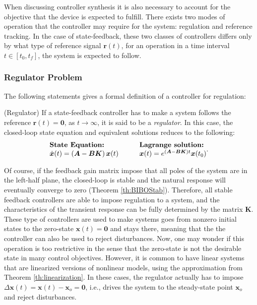 \documentclass[a4paper,11pt]{book}
\numberwithin{figure}{chapter}
\numberwithin{equation}{chapter}
\numberwithin{table}{chapter}
\theoremstyle{definition}
\newtheorem{definition}{Definition}[chapter]
\newcounter{boxed-theorem}
\newcounter{boxed-definition}
\newenvironment{boxed-definition}[1]
{\colorlet{shadecolor}{pastelYellow!15} \begin{shaded} \begin{definition}{#1}}
{\end{definition} \end{shaded}}
\newcounter{boxed-example}
\begin{document}
When discussing controller synthesis it is also necessary to account for the objective that the device is expected to fulfill. There exists two modes of operation that the controller may require for the system: regulation and reference tracking. In the case of state-feedback, these two classes of controllers differs only by what type of reference signal $\bm{r}(t)$, for an operation in a time interval $t \in [t_0, t_f]$, the system is expected to follow. 

\subsubsection{Regulator Problem}

The following statements gives a formal definition of a controller for regulation:

\begin{boxed-definition}{(Regulator)} \label{def:regulator}
    If a state-feedback controller has to make a system follows the reference $\bm{r}(t) = \bm{0}$, as $t \to \infty$, it is said to be a \textit{regulator}. In this case, the closed-loop state equation and equivalent solutions reduces to the following:
        \begin{align}
    \begin{matrix*}[l]
    \textbf{State Equation:} \hfill & & & \textbf{Lagrange solution:} \hfill \\
    \dot{\bm{x}}(t) = \left( \bm{A} - \bm{B} \bm{K} \right) \bm{x}(t)  & & &
    \bm{x}(t) = e^{(\bm{A} - \bm{B} \bm{K}) t} \bm{x}(t_0) \hfill
    \end{matrix*}
    .\end{align}
\end{boxed-definition}

Of course, if the feedback gain matrix impose that all poles of the system are in the left-half plane, the closed-loop is stable and the natural response will eventually converge to zero (Theorem \ref{th:BIBOStab}). Therefore, all stable feedback controllers are able to impose regulation to a system, and the characteristics of the transient response can be fully determined by the matrix $\bm{K}$. These type of controllers are used to make systems goes from nonzero initial states to the zero-state $\bm{x}(t) = \bm{0}$ and stays there, meaning that the the controller can also be used to reject disturbances. Now, one may wonder if this operation is too restrictive in the sense that the zero-state is not the desirable state in many control objectives. However, it is common to have linear systems that are linearized versions of nonlinear models, using the approximation from Theorem \ref{th:linearization}. In these cases, the regulator actually has to impose $\Delta \bm{x}(t) = \bm{x}(t) - \bm{x}_o = \bm{0}$, i.e., drives the system to the steady-state point $\bm{x}_o$ and reject disturbances. 
\end{document}
